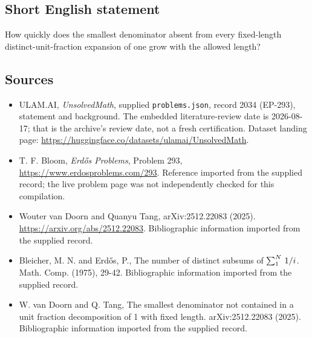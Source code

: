 \documentclass[11pt,a4paper]{article}
\begin{document}
\subsection{Short English statement}

How quickly does the smallest denominator absent from every fixed-length distinct-unit-fraction expansion of one grow with the allowed length?

\subsection{Sources}

{\small

\begin{itemize}

\item[\hypertarget{source:2034:1}{S1}] ULAM.AI, \emph{UnsolvedMath}, supplied \texttt{problems.json}, record 2034 (EP-293), statement and background. The embedded literature-review date is 2026-08-17; that is the archive’s review date, not a fresh certification. Dataset landing page: \url{https://huggingface.co/datasets/ulamai/UnsolvedMath}.

\item[\hypertarget{source:2034:2}{S2}] T. F. Bloom, \emph{Erdős Problems}, Problem 293, \url{https://www.erdosproblems.com/293}. Reference imported from the supplied record; the live problem page was not independently checked for this compilation.

\item[\hypertarget{source:2034:3}{S3}] Wouter van Doorn and Quanyu Tang, arXiv:2512.22083 (2025). \url{https://arxiv.org/abs/2512.22083}. Bibliographic information imported from the supplied record.

\item[\hypertarget{source:2034:4}{S4}] Bleicher, M. N. and Erd\H{o}s, P., The number of distinct subsums of $\sum \sb{1}^{N}\,1/i$. Math. Comp. (1975), 29-42. Bibliographic information imported from the supplied record.

\item[\hypertarget{source:2034:5}{S5}] W. van Doorn and Q. Tang, The smallest denominator not contained in a unit fraction decomposition of 1 with fixed length. arXiv:2512.22083 (2025). Bibliographic information imported from the supplied record.

\end{itemize}

}

\label{end:2034}
\end{document}
